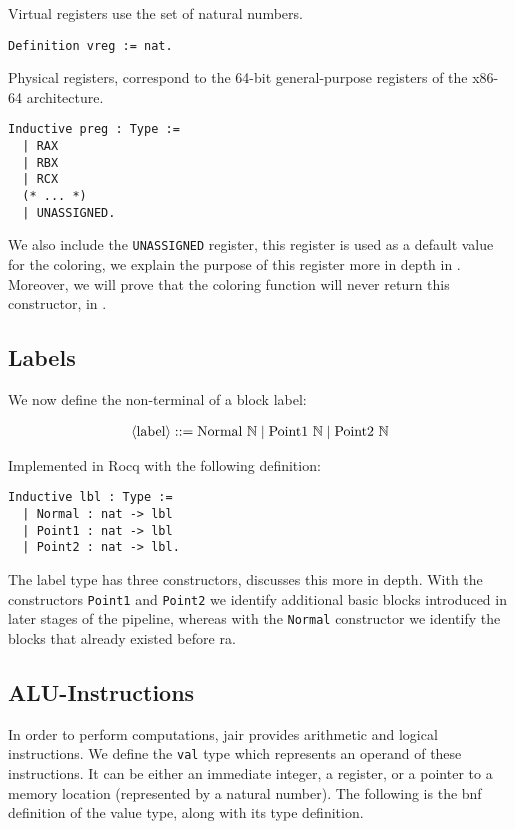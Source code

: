 Virtual registers use the set of natural numbers.

\begin{lstlisting}[style=Rocq]
Definition vreg := nat.
\end{lstlisting}

Physical registers, correspond to the 64-bit general-purpose registers of the x86-64 architecture.

\begin{lstlisting}[style=Rocq]
Inductive preg : Type :=
  | RAX
  | RBX
  | RCX
  (* ... *)
  | UNASSIGNED.
\end{lstlisting}

We also include the \texttt{UNASSIGNED} register, this register is used as a default value for the coloring, we explain the purpose of this register more in depth in . Moreover, we will prove that the coloring function will never return this constructor, in .

\subsection{Labels}

We now define the non-terminal of a block label:

\begin{align*}
\langle\text{label}\rangle ::= \text{Normal} \ \mathbb N \mid \text{Point1} \ \mathbb N \mid \text{Point2} \ \mathbb N
\end{align*}

Implemented in Rocq with the following definition:

\begin{lstlisting}[style=Rocq]
Inductive lbl : Type :=
  | Normal : nat -> lbl
  | Point1 : nat -> lbl
  | Point2 : nat -> lbl.
\end{lstlisting}

The label type has three constructors,  discusses this more in depth. With the constructors \texttt{Point1} and \texttt{Point2} we identify additional basic blocks introduced in later stages of the pipeline, whereas with the \texttt{Normal} constructor we identify the blocks that already existed before \gls{ra}.

\subsection{ALU-Instructions}

In order to perform computations, \gls{jair} provides arithmetic and logical instructions.
We define the \texttt{val} type which represents an operand of these instructions. It can be either an immediate integer, a register, or a pointer to a memory location (represented by a natural number). The following is the \gls{bnf} definition of the value type, along with its type definition.

